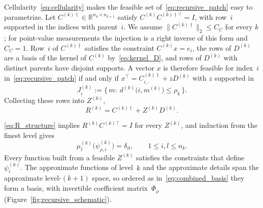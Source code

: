 \documentclass[hidelinks]{siamart}
\theoremstyle{nonumberplain}
\numberwithin{theorem}{section}
\begin{document}
Cellularity~\eqref{eq:cellularity} makes the feasible set
of~\eqref{eq:recursive_patch} easy to
parametrize. Let $C^{(k)\dagger} \in \mathbb{R}^{n_k \times n_{k+1}}$ satisfy
$C^{(k)} C^{(k)\dagger\top} = I$, with row~$i$ supported in the indices
with parent~$i$.  We assume $\|C^{(k)\dagger}\|_2 \leq C_C$ for every $k$;
for point-value measurements the injection is a right inverse of this
form and $C_C = 1$.  Row~$i$ of $C^{(k)\dagger}$
satisfies the constraint $C^{(k)} x = e_i$, the rows of $D^{(k)}$ are a
basis of the kernel of $C^{(k)}$ by~\eqref{eq:kernel_D}, and rows of
$D^{(k)}$ with distinct parents have disjoint supports.  A vector $x$ is therefore feasible for
index~$i$ in~\eqref{eq:recursive_patch} if and only if
$x^\top = C^{(k)\dagger}_{i,\cdot} + z D^{(k)}$ with $z$ supported in
\begin{equation}\label{eq:patch_detail_set}
  J^{(k)}_i := \bigl\{\, m :\ d^{(k)}\bigl(i, m^{(k)}\bigr) \leq \rho_k \,\bigr\} .
\end{equation}
Collecting these rows into $Z^{(k)}$,
\begin{equation}\label{eq:R_structure}
  R^{(k)} = C^{(k)\dagger} + Z^{(k)} D^{(k)} .
\end{equation}

\eqref{eq:R_structure} implies
$R^{(k)} C^{(k)\top} = I$ for every $Z^{(k)}$, and induction from the
finest level gives
\begin{equation}\label{eq:measurement_matching}
  \mu^{(k)}_l\bigl(\psi^{(k)}_{\rho,i}\bigr) = \delta_{il},
  \qquad 1 \leq i, l \leq n_k .
\end{equation}
Every function built from a feasible $Z^{(k)}$ satisfies the constraints
that define $\psi^{(k)}_i$.  The approximate functions of level~$k$ and
the approximate details span the approximate level-$(k{+}1)$ space, so
ordered as in~\eqref{eq:combined_basis} they form a basis, with
invertible coefficient matrix~$\Phi_\rho$
(Figure~\ref{fig:recursive_schematic}).
\end{document}
